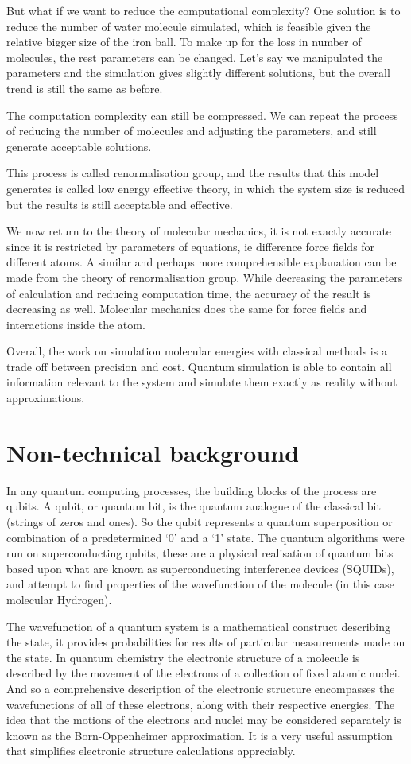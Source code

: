 \documentclass[12pt]{article}
\begin{document}
But what if we want to reduce the computational complexity? One solution is to reduce the number of water molecule simulated, which is feasible given
 the relative bigger size of the iron ball. To make up for the loss in number of molecules, the rest parameters can be changed. Let’s say we
 manipulated the parameters and the simulation gives slightly different solutions, but the overall trend is still the same as before.

The computation complexity can still be compressed. We can repeat the process of reducing the number of molecules and adjusting the parameters,
 and still generate acceptable solutions.

This process is called renormalisation group, and the results that this model generates is called low energy effective theory, in which the system
 size is reduced but the results is still acceptable and effective.

We now return to the theory of molecular mechanics, it is not exactly accurate since it is restricted by parameters of equations, ie difference
force fields for different atoms. A similar and perhaps more comprehensible explanation can be made from the theory of renormalisation group.
While decreasing the parameters of calculation and reducing computation time, the accuracy of the result is decreasing as well. Molecular mechanics
 does the same for force fields and interactions inside the atom.

Overall, the work on simulation molecular energies with classical methods is a trade off between precision and cost. Quantum simulation is able
to contain all information relevant to the system and simulate them exactly as reality without approximations.


\section{Non-technical background}
In any quantum computing processes, the building blocks of the process are qubits. A qubit, or quantum bit, is the quantum analogue of the classical
 bit (strings of zeros and ones). So the qubit represents a quantum superposition or combination of a predetermined ‘0’ and a ‘1’ state. The quantum
  algorithms were run on superconducting qubits, these are a physical realisation of quantum bits based upon what are known as superconducting
  interference devices (SQUIDs), and attempt to find properties of the wavefunction of the molecule (in this case molecular Hydrogen).

The wavefunction of a quantum system is a mathematical construct describing the state, it provides probabilities for results of particular measurements
 made on the state. In quantum chemistry the electronic structure of a molecule is described by the movement of the electrons of a collection of fixed
  atomic nuclei. And so a comprehensive description of the electronic structure encompasses the wavefunctions of all of these electrons, along with
  their respective energies. The idea that the motions of the electrons and nuclei may be considered separately is known as the Born-Oppenheimer
  approximation. It is a very useful assumption that simplifies electronic structure calculations appreciably.
\end{document}
